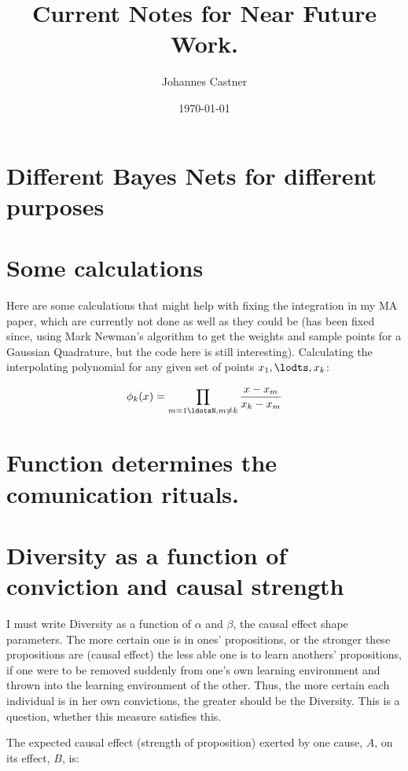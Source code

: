 \documentclass[11pt]{article}
\title{Current Notes for Near Future Work.}
\author{Johannes Castner}
\date{\today}
\begin{document}
\maketitle

\setcounter{tocdepth}{3}
\tableofcontents
\vspace*{1cm}


\newpage

\section{Different Bayes Nets for different purposes}
\label{sec-1}
\section{Some calculations}
\label{sec-2}

Here are some calculations that might help with fixing the integration in my MA paper, which are currently not done as well as they could be (has been fixed since, using Mark Newman's algorithm to get the weights and sample points for a Gaussian Quadrature, but the code here is still interesting). Calculating the interpolating polynomial for any given set of points $x_1, \lodts, x_k$:

$$\phi_k(x)=\prod_{m=1\ldotsN, m\not=k}\frac{x-x_m}{x_k-x_m}$$
\section{Function determines the comunication rituals.}
\label{sec-3}
\section{Diversity as a function of conviction and causal strength}
\label{sec-4}

I must write Diversity as a function of $\alpha$ and $\beta$, the causal effect shape parameters. The more certain one is in ones' propositions, or the stronger these propositions are (causal effect) the less able one is to learn anothers' propositions, if one were to be removed suddenly from one's own learning environment and thrown into the learning environment of the other. Thus, the more certain each individual is in her own convictions, the greater should be the Diversity. This is a question, whether this measure satisfies this.

The expected causal effect (strength of proposition) exerted by one cause, $A$, on its effect, $B$, is:
\end{document}

